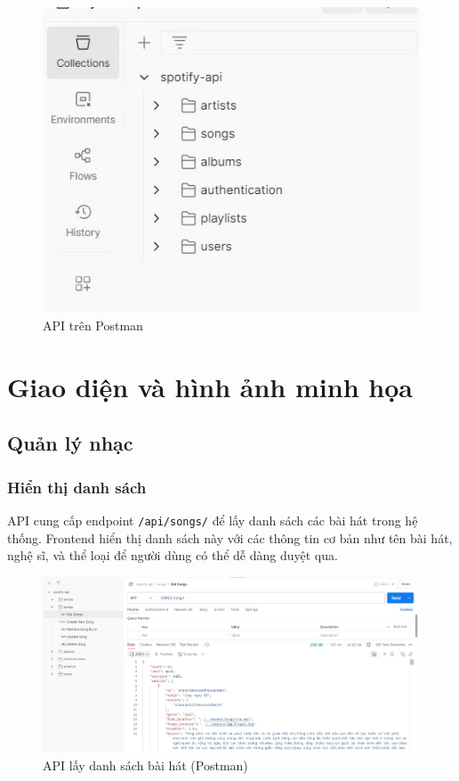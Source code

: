 \begin{itemize}
\begin{figure}[h]
    \centering
    \includegraphics[width=1\textwidth]{imgs/api-postman.jpg}
    \caption{API trên Postman}
\end{figure}
\end{itemize}

\section{Giao diện và hình ảnh minh họa}

\subsection{Quản lý nhạc}

\subsubsection{Hiển thị danh sách}
API cung cấp endpoint \texttt{/api/songs/} để lấy danh sách các bài hát trong hệ thống. Frontend hiển thị danh sách này với các thông tin cơ bản như tên bài hát, nghệ sĩ, và thể loại để người dùng có thể dễ dàng duyệt qua.

\begin{figure}[H]
    \centering
    \includegraphics[width=1\textwidth]{imgs/api-songs.jpg}
    \caption{API lấy danh sách bài hát (Postman)}
\end{figure}

